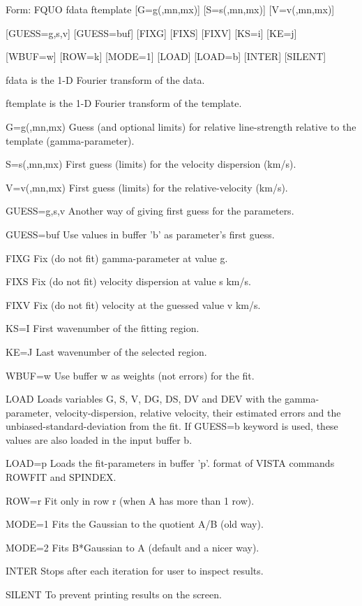 {\newpage\clearpage
{}%
\begin{command}
  \item[Form: FQUO fdata ftemplate {[G=g(,mn,mx)]} {[S=s(,mn,mx)]} 
       {[V=v(,mn,mx)]}\hfill]{}
  \item{{[GUESS=g,s,v]} {[GUESS=buf]} {[FIXG]} {[FIXS]} {[FIXV]} {[KS=i]} 
       {[KE=j]}}
  \item{{[WBUF=w]} {[ROW=k]} {[MODE=1]} {[LOAD]} {[LOAD=b]} {[INTER]} 
       {[SILENT]}}
  \item[fdata]{is the 1-D Fourier transform of the data.}
  \item[ftemplate]{is the 1-D Fourier transform of the template.}
  \item[G=g(,mn,mx)]{Guess (and optional limits) for relative line-strength
       relative to the template (gamma-parameter).}
  \item[S=s(,mn,mx)]{First guess (limits) for the velocity dispersion (km/s).}
  \item[V=v(,mn,mx)]{First guess (limits) for the relative-velocity (km/s).}
  \item[GUESS=g,s,v]{Another way of giving first guess for the parameters.}
  \item[GUESS=buf]{Use values in buffer 'b' as parameter's first guess.}
  \item[FIXG]{Fix (do not fit) gamma-parameter at value g.}
  \item[FIXS]{Fix (do not fit) velocity dispersion at value s km/s.}
  \item[FIXV]{Fix (do not fit) velocity at the guessed value v km/s.}
  \item[KS=I]{First wavenumber of the fitting region.}
  \item[KE=J]{Last wavenumber of the selected region.}
  \item[WBUF=w]{Use buffer w as weights (not errors) for the fit.}
  \item[LOAD]{Loads variables G, S, V, DG, DS, DV and DEV with the
       gamma-parameter, velocity-dispersion, relative velocity,
       their estimated errors and the unbiased-standard-deviation
       from the fit. If GUESS=b keyword is used, these values
       are also loaded in the input buffer b.}
  \item[LOAD=p]{Loads the fit-parameters in buffer 'p'.
       format of VISTA commands ROWFIT and SPINDEX.}
  \item[ROW=r]{Fit only in row r (when A has more than 1 row).}
  \item[MODE=1]{Fits the Gaussian to the quotient A/B (old way).}
  \item[MODE=2]{Fits B*Gaussian to A (default and a nicer way).}
  \item[INTER]{Stops after each iteration for user to inspect results.}
  \item[SILENT]{To prevent printing results on the screen.}
\end{command}%
\lthtmlfigureZ
\lthtmlcheckvsize\clearpage}

